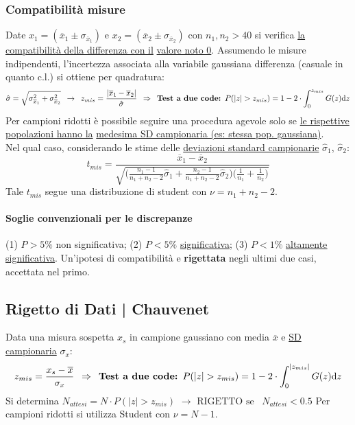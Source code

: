 \documentclass[11pt]{article}
\begin{document}
\subsubsection*{Compatibilità misure}
Date $x_1 = (\overline{x}_1 \pm \sigma_{\overline{x}_1})$ e $x_2 = (\overline{x}_2 \pm \sigma_{\overline{x}_2})$ con $n_1, n_2 > 40$ si verifica \underline{la compatibilità della differenza con il} \underline{valore noto 0}. Assumendo le misure indipendenti, l'incertezza associata alla variabile gaussiana differenza (casuale in quanto c.l.) si ottiene per quadratura:
\[\hat{\sigma} = \sqrt{\sigma_{\overline{x}_1}^2 + \sigma_{\overline{x}_2}^2} \enspace \rightarrow \enspace z_{mis} = \frac{|\overline{x}_1 - \overline{x}_2|}{\hat{\sigma}} \enspace \Rightarrow \enspace \textrm{\textbf{Test a due code: }} P(|z| > z_{mis}) = 1 - 2 \cdot \int_{0}^{z_{mis}} G(z) \textrm{d}z\]
Per campioni ridotti è possibile seguire una procedura agevole solo se \underline{le rispettive popolazioni hanno la} \underline{medesima SD campionaria (es: stessa pop. gaussiana)}.\\Nel qual caso, considerando le stime delle \underline{deviazioni standard campionarie} $\hat{\sigma}_1$, $\hat{\sigma}_2$:
\[t_{mis} = \frac{\overline{x}_1 - \overline{x}_2}{\sqrt{\bigg(\frac{n_1 - 1}{n_1 + n_2 - 2} \hat{\sigma}_1 + \frac{n_2 - 1}{n_1 + n_2 - 2} \hat{\sigma}_2 \bigg) \bigg( \frac{1}{n_1} + \frac{1}{n_2} \bigg)}}\]
Tale $t_{mis}$ segue una distribuzione di student con $\nu = n_1 + n_2 -2$.

\paragraph{Soglie convenzionali per le discrepanze} (1) $P > 5\%$ non significativa; (2) $P < 5\%$ \underline{significativa}; (3) $P < 1\%$ \underline{\underline{altamente significativa}}. Un'ipotesi di compatibilità e \textbf{rigettata} negli ultimi due casi, accettata nel primo.

\subsection{Rigetto di Dati | Chauvenet}
Data una misura sospetta $x_s$ in campione gaussiano con media $\overline{x}$ e \underline{SD campionaria} $\sigma_x$:
\[z_{mis} = \frac{x_s - \overline{x}}{\sigma_x} \enspace \Rightarrow \enspace \textrm{\textbf{Test a due code: }} P(|z| > z_{mis}) = 1 - 2 \cdot \int_{0}^{|z_{mis}|} G(z) \textrm{d}z\]
Si determina $N_{attesi} = N \cdot P(|z| > z_{mis})$ $\rightarrow$ $\boxed{\textrm{RIGETTO se }\enspace N_{attesi} < 0.5}$
Per campioni ridotti si utilizza Student con $\nu = N - 1$.
\end{document}
